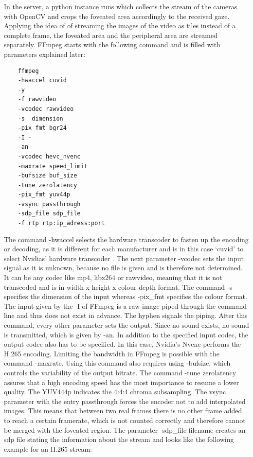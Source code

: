  \par
In the server, a python instance runs which collects the stream of the cameras with OpenCV and crops the foveated area accordingly to the received gaze. Applying the idea of \citeauthor{Guenter2016} of streaming the images of the video as tiles instead of a complete frame, the foveated area and the peripheral area are streamed separately. FFmpeg starts with the following command and is filled with parameters explained later:
\begin{lstlisting}
    ffmpeg 
    -hwaccel cuvid 
    -y 
    -f rawvideo
    -vcodec rawvideo 
    -s  dimension 
    -pix_fmt bgr24  
    -I -
    -an 
    -vcodec hevc_nvenc 
    -maxrate speed_limit 
    -bufsize buf_size 
    -tune zerolatency 
    -pix_fmt yuv44p 
    -vsync passthrough
    -sdp_file sdp_file 
    -f rtp rtp:ip_adress:port
\end{lstlisting} 
\noindent
The command -hwaccel selects the hardware transcoder to fasten up the encoding or decoding, as it is different for each manufacturer and is in this case ‘cuvid’ to select Nvidias’ hardware transcoder . The next parameter -vcodec sets the input signal as it is unknown, because no file is given and is therefore not determined. It can be any codec like mp4, libx264 or rawvideo, meaning that it is not transcoded and is in width x height x colour-depth format. The command -s specifies the dimension of the input whereas -pix\_fmt specifies the colour format. The input given by the -I of FFmpeg is a raw image piped through the command line and thus does not exist in advance. The hyphen signals the piping. After this command, every other parameter sets the output. Since no sound exists, no sound is transmitted, which is given by -an. In addition to the specified input codec, the output codec also has to be specified. In this case, Nvidia’s Nvenc performs the H.265 encoding. Limiting the bandwidth in FFmpeg is possible with the command -maxrate. Using this command also requires using -bufsize, which controls the variability of the output bitrate. The command -tune zerolatency assures that a high encoding speed has the most importance to resume a lower quality. The YUV444p indicates the 4:4:4 chroma subsampling. The vsync parameter with the entry passthrough forces the encoder not to add interpolated images. This means that between two real frames there is no other frame added to reach a certain framerate, which is not counted correctly and therefore cannot be merged with the foveated region. The parameter -sdp\_file filename creates an sdp file stating the information about the stream and looks like the following example for an H.265 stream: 
